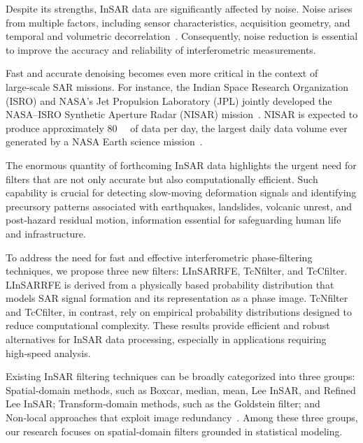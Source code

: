 \documentclass[remotesensing,article,submit,pdftex,moreauthors]{Definitions/mdpi}
\begin{document}
Despite its strengths, InSAR data are significantly affected by noise. 
Noise arises from multiple factors, including sensor characteristics, acquisition geometry, and temporal and volumetric decorrelation~\cite{EnhancedInterferometricPhaseNoiseFilteringoftheRefinedInSARFilter,Phase-BasedSimilarlyDecorrelatedPixelSelectionandPhase-Linking}. 
Consequently, noise reduction is essential to improve the accuracy and reliability of interferometric measurements. 

Fast and accurate denoising becomes even more critical in the context of large‑scale SAR missions. 
For instance, the Indian Space Research Organization (ISRO) and NASA’s Jet Propulsion Laboratory (JPL) jointly developed the NASA–ISRO Synthetic Aperture Radar (NISAR) mission~\cite{NISARmission}. 
NISAR is expected to produce approximately \qty{80}{\tera\byte} of data per day, the largest daily data volume ever generated by a NASA Earth science mission~\cite{rosen2023nisar}.

The enormous quantity of forthcoming InSAR data highlights the urgent need for filters that are not only accurate but also computationally efficient. 
Such capability is crucial for detecting slow‑moving deformation signals and identifying precursory patterns associated with earthquakes, landslides, volcanic unrest, and post‑hazard residual motion, information essential for safeguarding human life and infrastructure.

To address the need for fast and effective interferometric phase‑filtering techniques, we propose three new filters: LInSARRFE, TcNfilter, and TcCfilter.
LInSARRFE is derived from a physically based probability distribution that models SAR signal formation and its representation as a phase image.
TcNfilter and TcCfilter, in contrast, rely on empirical probability distributions designed to reduce computational complexity.
These results provide efficient and robust alternatives for InSAR data processing, especially in applications requiring high‑speed analysis.

Existing InSAR filtering techniques can be broadly categorized into three groups:
Spatial‑domain methods, such as Boxcar, median, mean, Lee InSAR, and Refined Lee InSAR;
Transform‑domain methods, such as the Goldstein filter; and
Non‑local approaches that exploit image redundancy~\cite{ANonlocalInSARFilterforHighResolutionDEMGenerationfromTanDEMXInterferograms}.
Among these three groups, our research focuses on spatial-domain filters grounded in statistical modeling. 
\end{document}
